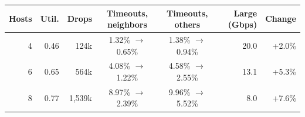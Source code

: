 \begin{tabular}{@{}rrrccrr@{}}
\toprule
Hosts & Util. & Drops & Timeouts, neighbors & Timeouts, others & Large (Gbps) & Change \\
\midrule
4 & 0.46 & 124k & 1.32\% $\to$ 0.65\% & 1.38\% $\to$ 0.94\% & 20.0 & +2.0\% \\
6 & 0.65 & 564k & 4.08\% $\to$ 1.22\% & 4.58\% $\to$ 2.55\% & 13.1 & +5.3\% \\
8 & 0.77 & 1{,}539k & 8.97\% $\to$ 2.39\% & 9.96\% $\to$ 5.52\% & 8.0 & +7.6\% \\
\bottomrule
\end{tabular}
